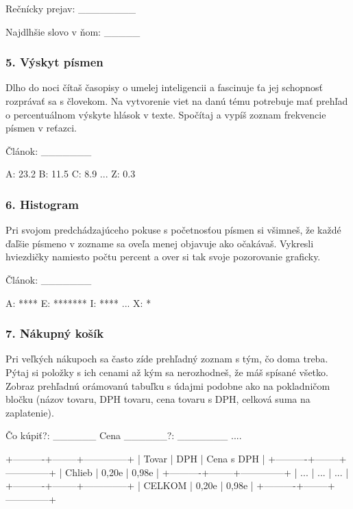 \begin{code}
Rečnícky prejav: ________

Najdlhšie slovo v ňom: _____
\end{code}

\subsubsection*{5. Výskyt písmen}
Dlho do noci čítaš časopisy o umelej inteligencii a fascinuje ťa jej schopnosť rozprávať sa s človekom. Na vytvorenie viet na danú tému potrebuje mať prehľad o percentuálnom výskyte hlások v texte. Spočítaj a vypíš zoznam frekvencie písmen v reťazci.

\begin{code}
Článok: _______

A: 23.2 %
B: 11.5 %
C: 8.9 %
...
Z: 0.3 %
\end{code}


\subsubsection*{6. Histogram}
Pri svojom predchádzajúceho pokuse s početnosťou písmen si všimneš, že každé ďaľšie písmeno v zozname sa oveľa menej objavuje ako očakávaš. Vykresli hviezdičky namiesto počtu percent a over si tak svoje pozorovanie graficky.

\begin{code}
Článok: _______

A: ****
E: *******
I: ****
...
X: *
\end{code}


\subsubsection*{7. Nákupný košík}
Pri veľkých nákupoch sa často zíde prehľadný zoznam s tým, čo doma treba. Pýtaj si položky s ich cenami až kým sa nerozhodneš, že máš spísané všetko. Zobraz prehľadnú orámovanú tabuľku s údajmi podobne ako na pokladničom bločku (názov tovaru, DPH tovaru, cena tovaru s DPH, celková suma na zaplatenie).

\begin{code}
Čo kúpiť?: ______
Cena ______?: _______
....

+----------+--------+--------------+
| Tovar    |  DPH   |  Cena s DPH  |
+----------+--------+--------------+
| Chlieb   |  0,20e |      0,98e   |
+----------+--------+--------------+
|    ...   |  ...   |     ...      |
+----------+--------+--------------+
| CELKOM   |  0,20e |      0,98e   |
+----------+--------+--------------+
\end{code}

